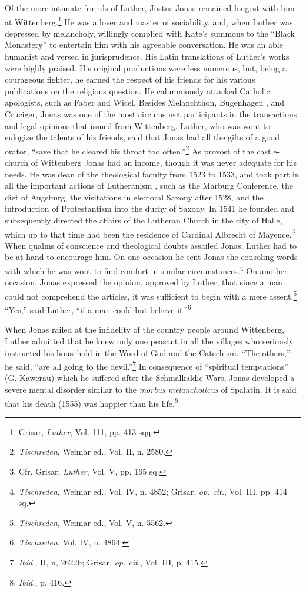 Of the more intimate friends of Luther, Justus Jonas remained
longest with him at Wittenberg.\footnote{Grisar, \textit{Luther}, Vol. 111, pp. 413 sqq.}
 He was a lover and master of
sociability, and, when Luther was depressed by melancholy, willingly
complied with Kate’s summons to the “Black Monastery” to entertain
him with his agreeable conversation. He was an able humanist and
versed in jurisprudence. His Latin translations of Luther’s works
were highly praised. His original productions were less numerous, but,
being a courageous fighter, he earned the respect of his friends for his
various publications on the religious question. He calumniously attacked
Catholic apologists, such as Faber and Wicel. Besides Melanchthon, Bugenhagen
, and Cruciger, Jonas was one of the most
circumspect participants in the transactions and legal opinions that
issued from Wittenberg. Luther, who was wont to eulogize the
talents of his friends, said that Jonas had all the gifts of a good orator,
“save that he cleared his throat too often.”\footnote{\textit{Tischreden}, Weimar ed., Vol. II, n. 2580.}
 As provost of the castle-church
of Wittenberg Jonas had an income, though it was never
adequate for his needs. He was dean of the theological faculty from
1523 to 1533, and took part in all the important actions of Lutheranism
, such as the Marburg Conference, the diet of Augsburg, the
visitations in electoral Saxony after 1528, and the introduction of
Protestantism into the duchy of Saxony. In 1541 he founded and
subsequently directed the affairs of the Lutheran Church in the city
of Halle, which up to that time had been the residence of Cardinal
Albrecht of Mayence.\footnote{Cfr. Grisar, \textit{Luther}, Vol. V, pp. 165 sq.}
 When qualms of conscience and theological
doubts assailed Jonas, Luther had to be at hand to encourage him.
On one occasion he sent Jonas the consoling words with which he
was wont to find comfort in similar circumstances.\footnote
{\textit{Tischreden}, Weimar ed., Vol. IV, n. 4852; Grisar, \textit{op. cit.}, Vol. III, pp. 414 sq.}
On another occasion,
Jonas expressed the opinion, approved by Luther, that since a
man could not comprehend the articles, it was sufficient to begin with
a mere assent.\footnote{\textit{Tischreden}, Weimar ed., Vol. V, n. 5562.}
“Yes,” said Luther, “if a man could but believe it.”\footnote{\textit{Tischreden}, Vol. IV, n. 4864.}

When Jonas railed at the infidelity of the country people around
Wittenberg, Luther admitted that he knew only one peasant in all
the villages who seriously instructed his household in the Word of
God and the Catechism. “The others,” he said, “are all going to the
devil.”\footnote{\textit{Ibid.}, II, n, 2622b; Grisar, \textit{op. cit.}, Vol. III, p. 415.}
 In consequence of “spiritual temptations” (G. Kawerau)
which he suffered after the Schmalkaldic Wars, Jonas developed a
severe mental disorder similar to the \textit{morbus melancholicus} of
Spalatin. It is said that his death (1555) was happier than his life.\footnote{\textit{Ibid.}, p. 416.}

